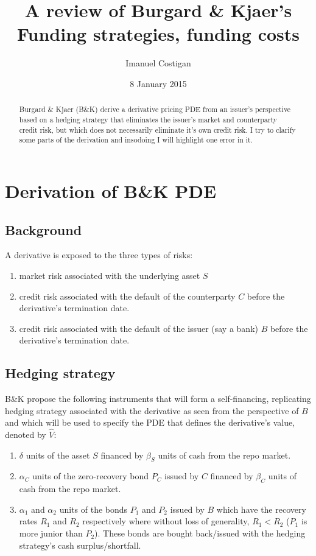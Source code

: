 \documentclass{tufte-handout}
\title{A review of Burgard \& Kjaer's Funding strategies, funding costs}
\author{Imanuel Costigan}
\date{8 January 2015}  %
\begin{document}
\maketitle%

\begin{abstract}
\noindent Burgard \& Kjaer (B\&K) \cite{bkfunding2013up} derive a derivative
pricing PDE from an issuer's perspective based on a hedging strategy that
eliminates the issuer's market and counterparty credit risk, but which does not
necessarily eliminate it's own credit risk. I try to clarify some parts of the
derivation and insodoing I will highlight one error in it.
\end{abstract}

\section{Derivation of B\&K PDE}\label{sec:derivation}

\subsection{Background}

A derivative is exposed to the three types of risks:

\begin{enumerate}
\item market risk associated with the underlying asset $S$
\item credit risk associated with the default of the counterparty $C$ before the
derivative's termination date.
\item credit risk associated with the default of the issuer (say a bank) $B$
before the derivative's termination date.
\end{enumerate}

\subsection{Hedging strategy}\label{sec:dynhedging}

B\&K propose the following instruments that will form a
self-financing, replicating hedging strategy associated with the
derivative as seen from the perspective of $B$ and which will be used to
specify the PDE that defines the derivative's value, denoted by $\hat{V}$:

\begin{enumerate}
\item $\delta$ units of the asset $S$ financed by $\beta_S$ units of cash
from the repo market.
\item $\alpha_C$ units of the zero-recovery bond $P_C$ issued by $C$ financed
by $\beta_C$ units of cash from the repo market.
\item $\alpha_1$ and $\alpha_2$ units of the bonds $P_1$ and $P_2$ issued
by $B$ which have the recovery rates $R_1$ and $R_2$ respectively where
without loss of generality, $R_1 < R_2$ ($P_1$ is more junior than $P_2$).
These bonds are bought back/issued with the hedging strategy's cash
surplus/shortfall.
\end{enumerate}
\end{document}
